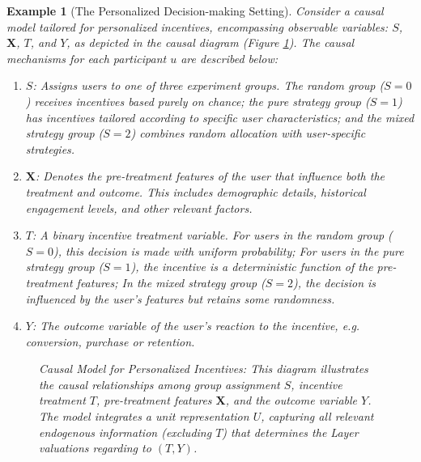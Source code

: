 \documentclass[letterpaper]{article} %
\newtheorem{example}[theorem]{Example}
\theoremstyle{definition}
\theoremstyle{remark}
\begin{document}
\begin{example}[The Personalized Decision-making Setting]
\label{eg:incentive}
Consider a causal model tailored for personalized incentives, encompassing observable variables: $S$, $\mathbf{X}$, $T$, and $Y$, as depicted in the causal diagram (Figure \ref{fig:incentive}). The causal mechanisms for each participant $u$ are described below:
\begin{enumerate}
    \item $S$:  Assigns users to one of three experiment groups. The random group ($S=0$) receives incentives based purely on chance; the pure strategy group ($S=1$) has incentives tailored according to specific user characteristics; and the mixed strategy group ($S=2$) combines random allocation with user-specific strategies.
    \item $\mathbf{X}$: Denotes the pre-treatment features of the user that influence both the treatment and outcome. This includes demographic details, historical engagement levels, and other relevant factors. 
    \item $T$: A binary incentive treatment variable. For users in the random group ($S=0$), this decision is made with uniform probability; For users in the pure strategy group ($S=1$), the incentive is a deterministic function of the pre-treatment features; In the mixed strategy group ($S=2$), the decision is influenced by the user's features but retains some randomness.
    \item $Y$: The outcome variable of the user's reaction to the incentive, e.g. conversion, purchase or retention.
\end{enumerate}
\begin{figure}[http]
\centering
    \caption{Causal Model for Personalized Incentives: This diagram illustrates the causal relationships among group assignment $S$, incentive treatment $T$, pre-treatment features $\mathbf{X}$, and the outcome variable $Y$. The model integrates a unit representation $U$, capturing all relevant endogenous information (excluding $T$) that determines the Layer valuations regarding to $(T, Y)$.}
\label{fig:incentive}
\end{figure}
\end{example}
\end{document}
